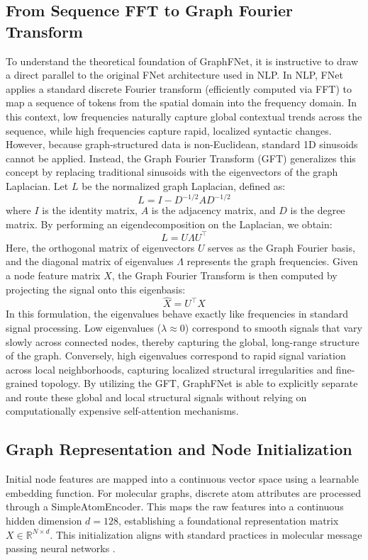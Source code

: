 \documentclass[10pt]{article}
\begin{document}
\subsection{From Sequence FFT to Graph Fourier Transform}
To understand the theoretical foundation of GraphFNet, it is instructive to draw a direct parallel to the original FNet architecture used in NLP. In NLP, FNet applies a standard discrete Fourier transform (efficiently computed via FFT) to map a sequence of tokens from the spatial domain into the frequency domain. In this context, low frequencies naturally capture global contextual trends across the sequence, while high frequencies capture rapid, localized syntactic changes. However, because graph-structured data is non-Euclidean, standard 1D sinusoids cannot be applied. Instead, the Graph Fourier Transform (GFT) generalizes this concept by replacing traditional sinusoids with the eigenvectors of the graph Laplacian. Let $L$ be the normalized graph Laplacian, defined as:
\begin{equation} \label{eq:laplacian}
L = I - D^{-1/2} A D^{-1/2}
\end{equation}
where $I$ is the identity matrix, $A$ is the adjacency matrix, and $D$ is the degree matrix. By performing an eigendecomposition on the Laplacian, we obtain:
\begin{equation} \label{eq:eigendecomp}
L = U \Lambda U^\top
\end{equation}
Here, the orthogonal matrix of eigenvectors $U$ serves as the Graph Fourier basis, and the diagonal matrix of eigenvalues $\Lambda$ represents the graph frequencies. Given a node feature matrix $X$, the Graph Fourier Transform is then computed by projecting the signal onto this eigenbasis:
\begin{equation} \label{eq:gft}
\hat{X} = U^\top X
\end{equation}
In this formulation, the eigenvalues behave exactly like frequencies in standard signal processing. Low eigenvalues ($\lambda \approx 0$) correspond to smooth signals that vary slowly across connected nodes, thereby capturing the global, long-range structure of the graph. Conversely, high eigenvalues correspond to rapid signal variation across local neighborhoods, capturing localized structural irregularities and fine-grained topology. By utilizing the GFT, GraphFNet is able to explicitly separate and route these global and local structural signals without relying on computationally expensive self-attention mechanisms.

\subsection{Graph Representation and Node Initialization}
Initial node features are mapped into a continuous vector space using a learnable embedding function. For molecular graphs, discrete atom attributes are processed through a SimpleAtomEncoder. This maps the raw features into a continuous hidden dimension $d=128$, establishing a foundational representation matrix $X \in \mathbb{R}^{N \times d}$. This initialization aligns with standard practices in molecular message passing neural networks \citep{gilmer2017neural, hu2020strategies}.
\end{document}
